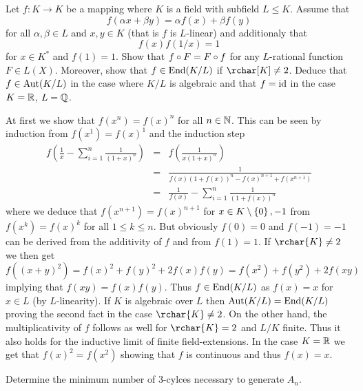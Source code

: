 \documentclass[8pt,a4paper]{article}
\begin{document}
\begin{exercise}\label{cauchy-f-eq}
    Let $f:K\to K$ be a mapping where $K$ is a field with subfield $L\leq K$. Assume that
    \[
    f(\alpha x+\beta y)=\alpha f(x)+\beta f(y)
    \]
    for all $\alpha,\beta\in L$ and $x,y\in K$ (that is $f$ is $L$-linear) and additionaly that
    \[
    f(x)f(1/x)=1
    \]
    for $x\in K^{\ast}$ and $f(1)=1$.
    Show that $f\circ F=F\circ f$ for any $L$-rational function $F\in L(X)$. Moreover, show that $f\in\mathop\mathrm{End}\nolimits(K/L)$ if $\rchar[K]\neq 2$.
    Deduce that $f\in\mathop\mathrm{Aut}\nolimits(K/L)$ in the case where $K/L$ is algebraic and that $f=\mathop\mathrm{id}\nolimits$ in the case $K=\mathbb{R}$, $L=\mathbb{Q}$.
\end{exercise}

\begin{solution}[\ref{cauchy-f-eq}]
    At first we show that $f(x^n)=f(x)^n$ for all $n\in\mathbb{N}$. This can be seen by induction from $f(x^1)=f(x)^1$ and the induction step
    \begin{eqnarray*}
        f\left(\frac{1}{x}-\sum\limits_{i=1}^n{\frac{1}{{(1+x)}^n}}\right)
        &=& f\left(\frac{1}{x{(1+x)}^n}\right)\\
        &=& \frac{1}{f(x){(1+f(x))}^n-{f(x)}^{n+1}+f(x^{n+1})}\\
        &=& \frac{1}{f(x)}-\sum\limits_{i=1}^n{\frac{1}{{(1+f(x))}^n}}
\end{eqnarray*}
where we deduce that $f(x^{n+1})={f(x)}^{n+1}$ for $x\in K\setminus\set{0,-1}$ from $f(x^k)={f(x)}^k$ for all $1\leq k\leq n$.
But obviously $f(0)=0$ and $f(-1)=-1$ can be derived from the additivity of $f$ and from $f(1)=1$.
If $\rchar{K}\neq 2$ we then get $f({(x+y)}^2)={f(x)}^2+{f(y)}^2+2f(x)f(y)=f(x^2)+f(y^2)+2f(xy)$ implying that $f(xy)=f(x)f(y)$. Thus $f\in\mathop\mathrm{End}\nolimits(K/L)$ as $f(x)=x$ for $x\in L$ (by $L$-linearity).
If $K$ is algebraic over $L$ then $\mathop\mathrm{Aut}\nolimits(K/L)=\mathop\mathrm{End}\nolimits(K/L)$ proving the second fact in the case $\rchar{K}\neq 2$.
On the other hand, the multiplicativity of $f$ follows as well for $\rchar{K}=2$ and $L/K$ finite.
Thus it also holds for the inductive limit of finite field-extensions.
In the case $K=\mathbb{R}$ we get that $f(x)^2=f(x^2)$ showing that $f$ is continuous and thus $f(x)=x$.
\end{solution}

\begin{exercise}\label{3-cycl-an}
    Determine the minimum number of $3$-cylces necessary to generate $A_n$.
\end{exercise}
\end{document}
